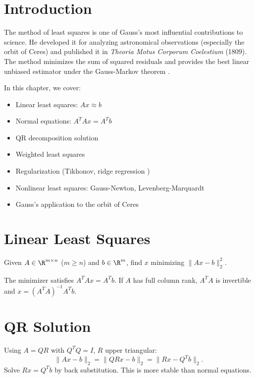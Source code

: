 \section{Introduction}

The method of least squares  is one of Gauss's most influential contributions to science. He developed it for analyzing astronomical observations (especially the orbit of Ceres) and published it in \textit{Theoria Motus Corporum Coelestium} (1809). The method minimizes the sum of squared residuals and provides the best linear unbiased estimator under the Gauss-Markov theorem .

In this chapter, we cover:
\begin{itemize}
    \item Linear least squares: $Ax \approx b$
    \item Normal equations: $A^T A x = A^T b$
    \item QR decomposition solution
    \item Weighted least squares
    \item Regularization (Tikhonov, ridge regression )
    \item Nonlinear least squares: Gauss-Newton, Levenberg-Marquardt 
    \item Gauss's application to the orbit of Ceres
\end{itemize}

\section{Linear Least Squares}

Given $A \in \R^{m \times n}$ ($m \ge n$) and $b \in \R^m$, find $x$ minimizing $\|Ax - b\|_2^2$.

\begin{theorem}
The minimizer satisfies $A^T A x = A^T b$. If $A$ has full column rank, $A^T A$ is invertible and $x = (A^T A)^{-1} A^T b$.
\end{theorem}

\section{QR Solution}

Using $A = QR$ with $Q^T Q = I$, $R$ upper triangular:
\[
\|Ax - b\|_2 = \|QRx - b\|_2 = \|Rx - Q^T b\|_2.
\]
Solve $Rx = Q^T b$ by back substitution. This is more stable than normal equations.

